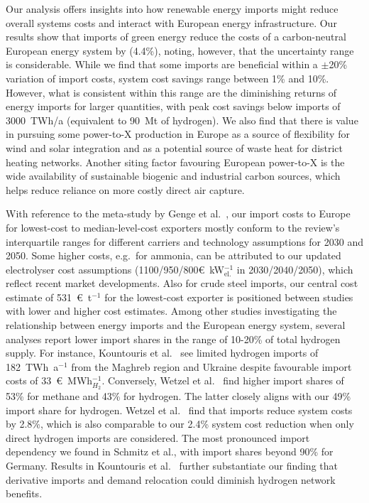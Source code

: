 Our analysis offers insights into how renewable energy imports might reduce
overall systems costs and interact with European energy infrastructure. Our
results show that imports of green energy reduce the costs of a carbon-neutral
European energy system by  (4.4\%), noting, however, that the
uncertainty range is considerable. While we find that some imports are
beneficial within a $\pm$20\% variation of import costs, system cost savings
range between 1\% and 10\%. However, what is consistent within this range are
the diminishing returns of energy imports for larger quantities, with peak cost
savings below imports of 3000~TWh/a (equivalent to 90~Mt of hydrogen). We also find
that there is value in pursuing some \mbox{power-to-X} production in Europe as a
source of flexibility for wind and solar integration and as a potential source
of waste heat for district heating networks. Another siting factor favouring
European \mbox{power-to-X} is the wide availability of sustainable biogenic and
industrial carbon sources, which helps reduce reliance on more costly direct air
capture.

With reference to the meta-study by Genge et al.~\cite{gengeSupplyCostsGreen2023},
our import costs to Europe for lowest-cost to median-level-cost exporters
mostly conform to the review's interquartile ranges for different carriers and
technology assumptions for 2030 and 2050. Some higher costs, e.g.~for
ammonia, can be attributed to our updated electrolyser cost assumptions
(1100/950/800\euro{}~kW$_\text{el.}^{-1}$ in 2030/2040/2050), which reflect
recent market developments.\cite{ieaGlobalHydrogenReview2024} Also for crude
steel imports, our central cost estimate of 531~\euro{}~t$^{-1}$ for the
lowest-cost exporter is positioned between studies with
lower\cite{lopezDefossilisedSteel2023} and
higher\cite{verpoortImpactGlobalHeterogeneity2024} cost estimates. Among other
studies investigating the relationship between energy imports and the European
energy system, several analyses report lower import shares in the range of
10-20\% of total hydrogen
supply.\cite{seckHydrogenDecarbonization2022,frischmuthHydrogenSourcingStrategies2022,kountourisUnifiedEuropeanHydrogen2024}
For instance, Kountouris et al.~\cite{kountourisUnifiedEuropeanHydrogen2024} see
limited hydrogen imports of 182~TWh~a$^{-1}$ from the Maghreb region and Ukraine
despite favourable import costs of 33~\euro{}~MWh$_{H_2}^{-1}$. Conversely,
Wetzel et al.~\cite{wetzelGreenEnergy2023a} find higher import shares of 53\%
for methane and 43\% for hydrogen. The latter closely aligns with our 49\%
import share for hydrogen. Wetzel et al.~\cite{wetzelGreenEnergy2023a} find that
imports reduce system costs by 2.8\%, which is also comparable to our 2.4\%
system cost reduction when only direct hydrogen imports are considered. The most
pronounced import dependency we found in Schmitz et
al.\cite{schmitzImplicationsHydrogenImport2024a}, with import shares beyond 90\%
for Germany. Results in Kountouris et
al.~\cite{kountourisUnifiedEuropeanHydrogen2024} further substantiate our
finding that derivative imports and demand relocation could diminish hydrogen
network benefits.

